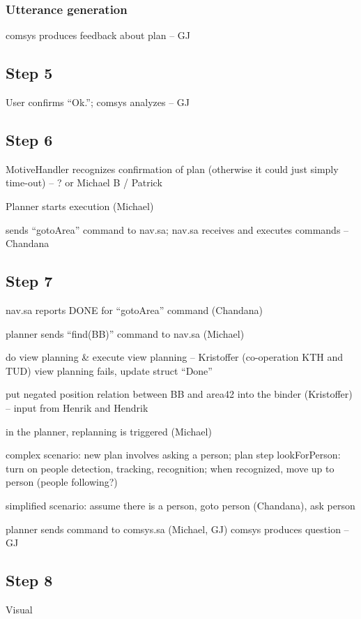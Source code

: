 \documentclass{article}
\begin{document}
\subsubsection{Utterance generation}
comsys produces feedback about plan -- GJ


\subsection{Step 5}
User confirms ``Ok.''; comsys analyzes -- GJ

\subsection{Step 6}
MotiveHandler recognizes confirmation of plan (otherwise it could just simply time-out)
-- ? or Michael B / Patrick

Planner starts execution (Michael)

sends ``gotoArea'' command to nav.sa; nav.sa receives and executes commands -- Chandana


\subsection{Step 7}
nav.sa reports DONE for ``gotoArea'' command (Chandana)
 
planner sends ``find(BB)'' command to nav.sa (Michael)

do view planning \& execute view planning -- Kristoffer (co-operation KTH and TUD)
view planning fails, update struct ``Done''

put negated position relation between BB and area42 into the binder (Kristoffer)
-- input from Henrik and Hendrik

in the planner, replanning is triggered (Michael)

complex scenario:
new plan involves asking a person; plan step lookForPerson: turn on people detection, tracking,
recognition; when recognized, move up to person (people following?)

simplified scenario:
assume there is a person, goto person (Chandana), ask person

planner sends command to comsys.sa (Michael, GJ)
comsys produces question -- GJ



\subsection{Step 8}
Visual 
\end{document}
